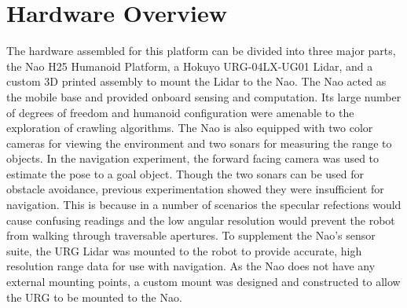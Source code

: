 \section{Hardware Overview}

The hardware assembled for this platform can be divided into three major parts,
the Nao H25 Humanoid Platform, a Hokuyo URG-04LX-UG01 Lidar, and a custom 3D
printed assembly to mount the Lidar to the Nao.
The Nao acted as the mobile base and provided onboard sensing and computation. 
Its large number of degrees of freedom and humanoid configuration were amenable
to the exploration of crawling algorithms.
The Nao is also equipped with two color cameras for viewing the environment
and two sonars for measuring the range to objects.
In the navigation experiment, the forward facing camera was used to estimate
the pose to a goal object.
Though the two sonars can be used for obstacle
avoidance, previous experimentation showed they
were insufficient for navigation. This is because in a number of scenarios the
specular refections would cause confusing readings and the low angular
resolution would prevent the robot from walking through traversable apertures.
To supplement the Nao's sensor suite, the URG Lidar was mounted to the robot
to provide accurate, high resolution range data for use with navigation.
As the Nao does not have any external mounting points, a custom mount was
designed and constructed to allow the URG to be mounted to the Nao.


%
%
%


